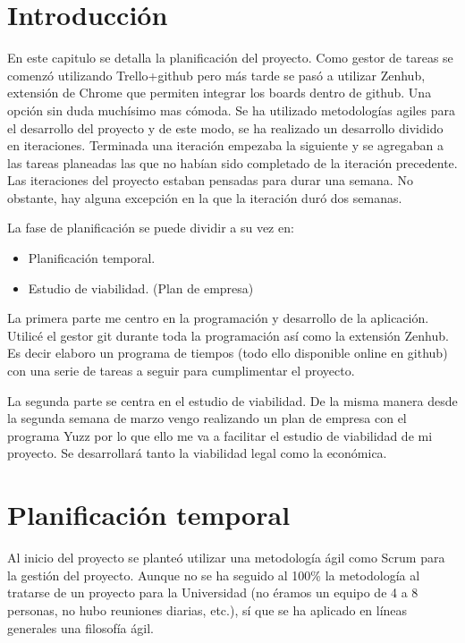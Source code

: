 
\section{Introducción}\label{introduccion-plan}
En este capitulo se detalla la planificación del proyecto. Como gestor de tareas se comenzó utilizando Trello+github pero más tarde se pasó a utilizar Zenhub, extensión de Chrome que permiten integrar los boards dentro de github. Una opción sin duda muchísimo mas cómoda. 
Se ha utilizado metodologías agiles para el desarrollo del proyecto y de este modo, se ha realizado un desarrollo dividido en iteraciones. Terminada una iteración empezaba la siguiente y se agregaban a las tareas planeadas las que no habían sido completado de la iteración precedente. Las iteraciones del proyecto estaban pensadas para durar una semana. No obstante, hay alguna excepción en la que la iteración duró dos semanas.

La fase de planificación se puede dividir a su vez en:

\begin{itemize}
\tightlist
\item
  Planificación temporal.
\item
  Estudio de viabilidad. (Plan de empresa) 
\end{itemize} 

La primera parte me centro en la programación y desarrollo de la aplicación. Utilicé el gestor git durante toda la programación así como la extensión Zenhub. Es decir elaboro un programa de tiempos (todo ello disponible online en github) con una serie de tareas a seguir para cumplimentar el proyecto.

La segunda parte se centra en el estudio de viabilidad. De la misma manera desde la segunda semana de marzo vengo realizando un plan de empresa con el programa Yuzz por lo que ello me va a facilitar el estudio de viabilidad de mi proyecto. Se desarrollará tanto la viabilidad legal como la económica. 


\section{Planificación temporal}\label{planificacion-temporal}
Al inicio del proyecto se planteó utilizar una metodología ágil como
Scrum para la gestión del proyecto. Aunque no se ha seguido al 100\% la
metodología al tratarse de un proyecto para la Universidad (no éramos un equipo de
4 a 8 personas, no hubo reuniones diarias, etc.), sí que se ha aplicado
en líneas generales una filosofía ágil.

